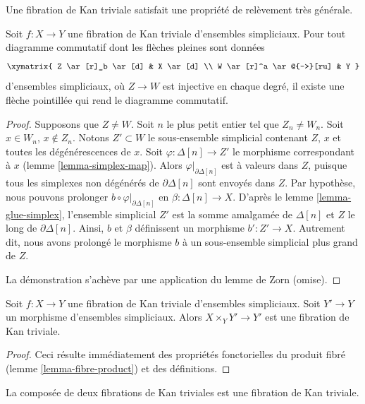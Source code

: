\noindent
Une fibration de Kan triviale satisfait une propriété de relèvement très générale.

\begin{lemma}
\label{lemma-trivial-kan}
Soit $f : X \to Y$ une fibration de Kan triviale d'ensembles simpliciaux.
Pour tout diagramme commutatif dont les flèches pleines sont données
$$
\xymatrix{
Z \ar[r]_b \ar[d] & X \ar[d] \\
W \ar[r]^a \ar@{-->}[ru] & Y
}
$$
d'ensembles simpliciaux, où $Z \to W$ est injective en chaque degré,
il existe une flèche pointillée qui rend le diagramme commutatif.
\end{lemma}

\begin{proof}
Supposons que $Z \not = W$. Soit $n$ le plus petit entier tel que
$Z_n \not = W_n$. Soit $x \in W_n$, $x \not \in Z_n$. Notons
$Z' \subset W$ le sous-ensemble simplicial contenant $Z$, $x$ et toutes les
dégénérescences de $x$. Soit $\varphi : \Delta[n] \to Z'$ le morphisme
correspondant à $x$ (lemme \ref{lemma-simplex-map}).
Alors $\varphi|_{\partial \Delta[n]}$ est à valeurs dans $Z$, puisque tous
les simplexes non dégénérés de $\partial \Delta[n]$ sont envoyés dans $Z$.
Par hypothèse, nous pouvons prolonger
$b \circ \varphi|_{\partial \Delta[n]}$ en
$\beta : \Delta[n] \to X$.
D'après le lemme \ref{lemma-glue-simplex}, l'ensemble simplicial $Z'$ est la
somme amalgamée de $\Delta[n]$ et $Z$ le long de $\partial \Delta[n]$.
Ainsi, $b$ et $\beta$ définissent un morphisme $b' : Z' \to X$.
Autrement dit, nous avons prolongé le morphisme $b$ à un sous-ensemble
simplicial plus grand de $Z$.

\medskip\noindent
La démonstration s'achève par une application du lemme de Zorn (omise).
\end{proof}

\begin{lemma}
\label{lemma-trivial-kan-base-change}
Soit $f : X \to Y$ une fibration de Kan triviale d'ensembles simpliciaux.
Soit $Y' \to Y$ un morphisme d'ensembles simpliciaux.
Alors $X \times_Y Y' \to Y'$ est une fibration de Kan triviale.
\end{lemma}

\begin{proof}
Ceci résulte immédiatement des propriétés fonctorielles du produit fibré
(lemme \ref{lemma-fibre-product}) et des définitions.
\end{proof}

\begin{lemma}
\label{lemma-trivial-kan-composition}
La composée de deux fibrations de Kan triviales est une fibration de Kan triviale.
\end{lemma}

